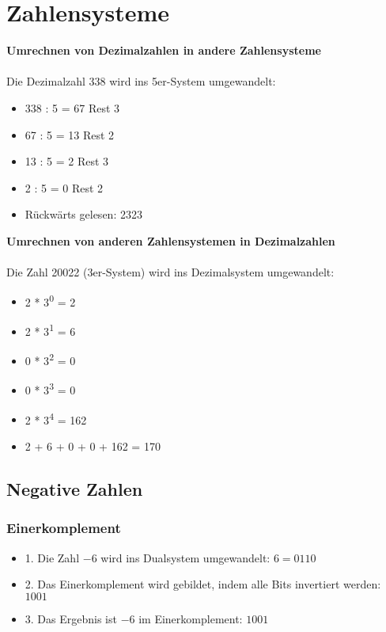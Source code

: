 \section{Zahlensysteme}

\textbf{Umrechnen von Dezimalzahlen in andere Zahlensysteme}\\\\
Die Dezimalzahl 338 wird ins 5er-System umgewandelt:
\begin{itemize}
    \item 338 : 5 = 67 Rest 3
    \item 67 : 5 = 13 Rest 2
    \item 13 : 5 = 2 Rest 3
    \item 2 : 5 = 0 Rest 2
    \item Rückwärts gelesen: 2323
\end{itemize}
\bigskip
\textbf{Umrechnen von anderen Zahlensystemen in Dezimalzahlen}\\\\
Die Zahl 20022 (3er-System) wird ins Dezimalsystem umgewandelt:
\begin{itemize}
    \item 2 * 3\textsuperscript{0} = 2
    \item 2 * 3\textsuperscript{1} = 6
    \item 0 * 3\textsuperscript{2} = 0
    \item 0 * 3\textsuperscript{3} = 0
    \item 2 * 3\textsuperscript{4} = 162
    \item 2 + 6 + 0 + 0 + 162 = 170
\end{itemize}
\subsection{Negative Zahlen}
\subsubsection{Einerkomplement}
\begin{itemize}
    \item 1. Die Zahl $-6$ wird ins Dualsystem umgewandelt: $6 = 0110$
    \item 2. Das Einerkomplement wird gebildet, indem alle Bits invertiert werden: $1001$
    \item 3. Das Ergebnis ist $-6$ im Einerkomplement: $1001$
    \end{itemize}
